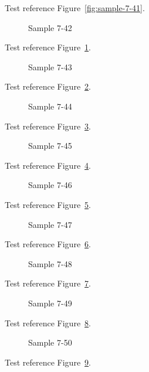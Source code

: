 Test reference Figure~\ref{fig:sample-7-41}.

\begin{figure}[tbhp]
\caption{Sample 7-42}
\label{fig:sample-7-42}
\end{figure}

Test reference Figure~\ref{fig:sample-7-42}.

\begin{figure}[tbhp]
\caption{Sample 7-43}
\label{fig:sample-7-43}
\end{figure}

Test reference Figure~\ref{fig:sample-7-43}.

\begin{figure}[tbhp]
\caption{Sample 7-44}
\label{fig:sample-7-44}
\end{figure}

Test reference Figure~\ref{fig:sample-7-44}.

\begin{figure}[tbhp]
\caption{Sample 7-45}
\label{fig:sample-7-45}
\end{figure}

Test reference Figure~\ref{fig:sample-7-45}.

\begin{figure}[tbhp]
\caption{Sample 7-46}
\label{fig:sample-7-46}
\end{figure}

Test reference Figure~\ref{fig:sample-7-46}.

\begin{figure}[tbhp]
\caption{Sample 7-47}
\label{fig:sample-7-47}
\end{figure}

Test reference Figure~\ref{fig:sample-7-47}.

\begin{figure}[tbhp]
\caption{Sample 7-48}
\label{fig:sample-7-48}
\end{figure}

Test reference Figure~\ref{fig:sample-7-48}.

\begin{figure}[tbhp]
\caption{Sample 7-49}
\label{fig:sample-7-49}
\end{figure}

Test reference Figure~\ref{fig:sample-7-49}.

\begin{figure}[tbhp]
\caption{Sample 7-50}
\label{fig:sample-7-50}
\end{figure}

Test reference Figure~\ref{fig:sample-7-50}.


